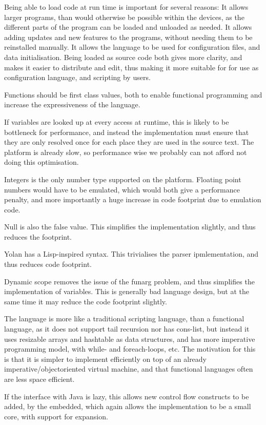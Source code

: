 \documentclass[11pt]{report}
\begin{document}
Being able to load code at run time is important for several reasons:
It allows larger programs, than would otherwise be possible within the devices, as the different parts of the program can be loaded and unloaded as needed.
It allows adding updates and new features to the programs, without needing them to be reinstalled manually.
It allows the language to be used for configuration files, and data initialisation.
Being loaded as source code both gives more clarity, and makes it easier to distribute and edit, thus making it more suitable for for use as configuration language, and scripting by users.

Functions should be first class values, both to enable functional programming and increase the expressiveness of the language.

If variables are looked up at every access at runtime, this is likely to be bottleneck for performance, and instead the implementation must ensure that they are only resolved once for each place they are used in the source text.
The platform is already slow, so performance wise we probably can not afford not doing this optimisation.

Integers is the only number type supported on the platform. Floating point numbers would have to be emulated, which would both give a performance penalty, and more importantly a huge increase in code footprint due to emulation code.

Null is also the false value. This simplifies the implementation slightly, and thus reduces the footprint.

Yolan has a Lisp-inspired syntax. This trivialises the parser ipmlementation, and thus reduces code footprint.

Dynamic scope removes the issue of the funarg problem, and thus simplifies the implementation of variables. This is generally bad language design, but at the same time it may reduce the code footprint slightly.

The language is more like a traditional scripting language, than a functional language, 
as it does not support tail recursion nor has cons-list, but instead it uses resizable arrays and hashtable as data structures, and has more imperative programming model, with while- and foreach-loops, etc.
The motivation for this is that it is simpler to implement efficiently on top of an already imperative/objectoriented virtual machine, and that functional languages often are less space efficient.

If the interface with Java is lazy, this allows new control flow constructs to be added, by the embedded, which again allows the implementation to be a small core, with support for expansion.
\end{document}
